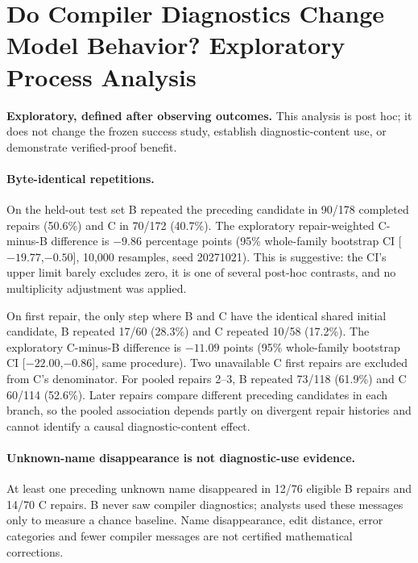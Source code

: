 \documentclass[runningheads,a4paper]{llncs}
\begin{document}
\section{Do Compiler Diagnostics Change Model Behavior? Exploratory Process Analysis}
\label{sec:process}
\noindent\textbf{Exploratory, defined after observing outcomes.}
This analysis is post hoc; it does not change the frozen success study,
establish diagnostic-content use, or demonstrate verified-proof benefit.

\paragraph{Byte-identical repetitions.}
On the held-out test set B repeated the preceding candidate in 90/178
completed repairs (50.6\%) and C in 70/172 (40.7\%). The exploratory
repair-weighted C-minus-B difference is $-9.86$ percentage points
(95\% whole-family bootstrap CI [$-19.77$,$-0.50$], 10,000 resamples,
seed 20271021). This is suggestive: the CI's upper limit barely
excludes zero, it is one of several post-hoc contrasts, and no
multiplicity adjustment was applied.

On first repair, the only step where B and C have the identical shared
initial candidate, B repeated 17/60 (28.3\%) and C repeated 10/58
(17.2\%). The exploratory C-minus-B difference is $-11.09$ points
(95\% whole-family bootstrap CI [$-22.00$,$-0.86$], same procedure).
Two unavailable C first repairs are excluded from C's denominator.
For pooled repairs 2--3, B repeated 73/118 (61.9\%) and C 60/114
(52.6\%). Later repairs compare different preceding candidates in
each branch, so the pooled association depends partly on divergent
repair histories and cannot identify a causal diagnostic-content effect.

\paragraph{Unknown-name disappearance is not diagnostic-use evidence.}
At least one preceding unknown name disappeared in 12/76 eligible B
repairs and 14/70 C repairs. B never saw compiler diagnostics;
analysts used these messages only to measure a chance baseline.
Name disappearance, edit distance, error categories and fewer
compiler messages are not certified mathematical corrections.
\end{document}

